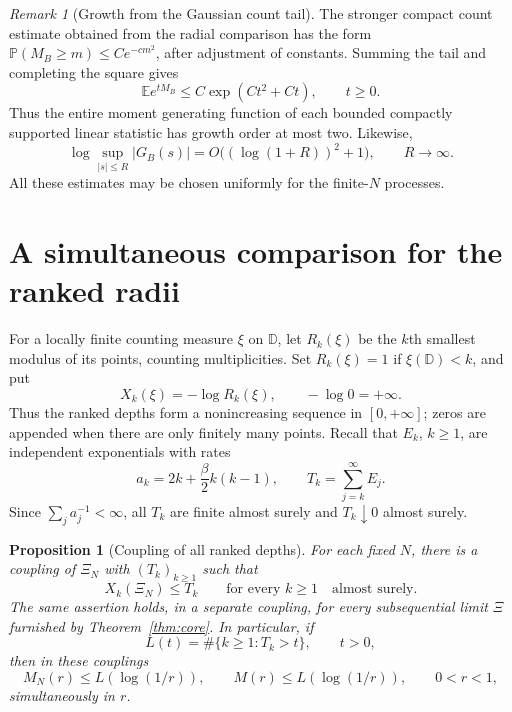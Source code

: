 \documentclass[11pt,a4paper]{article}
\numberwithin{equation}{section}
\newtheorem{proposition}[theorem]{Proposition}
\theoremstyle{definition}
\theoremstyle{remark}
\newtheorem{remark}[theorem]{Remark}
\newcommand{\D}{\mathbb D}
\newcommand{\E}{\mathbb E}
\newcommand{\Pbb}{\mathbb P}
\begin{document}
\begin{remark}[Growth from the Gaussian count tail]
\label{hier:transform-growth}
The stronger compact count estimate obtained from the radial
comparison has the form
$\Pbb(M_B\ge m)\le C e^{-cm^2}$, after adjustment of constants.
Summing the tail and completing the square gives
\[
 \E e^{tM_B}\le C\exp(Ct^2+Ct),\qquad t\ge0.
\]
Thus the entire moment generating function of each bounded compactly
supported linear statistic has growth order at most two.  Likewise,
\[
 \log\sup_{|s|\le R}|G_B(s)|
 =O\bigl((\log(1+R))^2+1\bigr),\qquad R\to\infty.
\]
All these estimates may be chosen uniformly for the finite-$N$
processes.
\end{remark}

\section{A simultaneous comparison for the ranked radii}
\label{rad:section-comparison}

For a locally finite counting measure $\xi$ on $\D$, let $R_k(\xi)$ be
the $k$th smallest modulus of its points, counting multiplicities.  Set
$R_k(\xi)=1$ if $\xi(\D)<k$, and put
\[
 X_k(\xi)=-\log R_k(\xi),
 \qquad -\log 0=+\infty.
\]
Thus the ranked depths form a nonincreasing sequence in $[0,+\infty]$;
zeros are appended when there are only finitely many points.  Recall that
$E_k$, $k\geq1$, are independent exponentials with rates
\[
 a_k=2k+\frac{\beta}{2}k(k-1),
 \qquad T_k=\sum_{j=k}^{\infty}E_j.
\]
Since $\sum_j a_j^{-1}<\infty$, all $T_k$ are finite almost surely and
$T_k\downarrow0$ almost surely.

\begin{proposition}[Coupling of all ranked depths]
\label{rad:prop-coupling}
For each fixed $N$, there is a coupling of $\Xi_N$ with $(T_k)_{k\geq1}$
such that
\begin{equation}
 X_k(\Xi_N)\leq T_k\qquad\text{for every }k\geq1
 \quad\text{almost surely}.
 \label{rad:eq-ranked-coupling}
\end{equation}
The same assertion holds, in a separate coupling, for every subsequential
limit $\Xi$ furnished by Theorem~\ref{thm:core}.  In particular, if
\[
 L(t)=\#\{k\geq1:T_k>t\},\qquad t>0,
\]
then in these couplings
\begin{equation}
 M_N(r)\leq L(\log(1/r)),\qquad
 M(r)\leq L(\log(1/r)),\qquad 0<r<1,
 \label{rad:eq-count-coupling}
\end{equation}
simultaneously in $r$.
\end{proposition}
\end{document}
